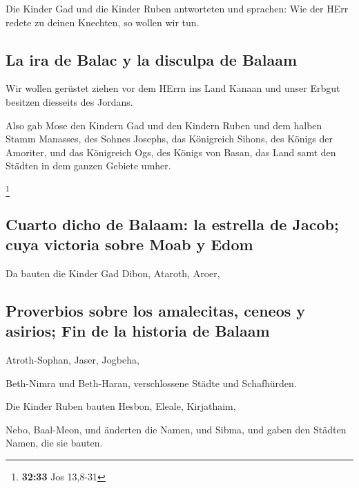  Die Kinder Gad und die Kinder Ruben antworteten und
sprachen: Wie der HErr redete zu deinen Knechten, so wollen wir tun.

\hypertarget{la-ira-de-balac-y-la-disculpa-de-balaam}{%
\subsection{La ira de Balac y la disculpa de
Balaam}\label{la-ira-de-balac-y-la-disculpa-de-balaam}}

 Wir wollen gerüstet ziehen vor dem HErrn ins Land Kanaan
und unser Erbgut besitzen diesseits des Jordans.

 Also gab Mose den Kindern Gad und den Kindern Ruben und
dem halben Stamm Manasses, des Sohnes Josephs, das Königreich Sihons,
des Königs der Amoriter, und das Königreich Ogs, des Königs von Basan,
das Land samt den Städten in dem ganzen Gebiete umher.

\footnote{\textbf{32:33} Jos 13,8-31}

\hypertarget{cuarto-dicho-de-balaam-la-estrella-de-jacob-cuya-victoria-sobre-moab-y-edom}{%
\subsection{Cuarto dicho de Balaam: la estrella de Jacob; cuya victoria
sobre Moab y
Edom}\label{cuarto-dicho-de-balaam-la-estrella-de-jacob-cuya-victoria-sobre-moab-y-edom}}

 Da bauten die Kinder Gad Dibon, Ataroth, Aroer,

\hypertarget{proverbios-sobre-los-amalecitas-ceneos-y-asirios-fin-de-la-historia-de-balaam}{%
\subsection{Proverbios sobre los amalecitas, ceneos y asirios; Fin de la
historia de
Balaam}\label{proverbios-sobre-los-amalecitas-ceneos-y-asirios-fin-de-la-historia-de-balaam}}

 Atroth-Sophan, Jaser, Jogbeha,

 Beth-Nimra und Beth-Haran, verschlossene Städte und
Schafhürden.

 Die Kinder Ruben bauten Hesbon, Eleale, Kirjathaim,

 Nebo, Baal-Meon, und änderten die Namen, und Sibma, und
gaben den Städten Namen, die sie bauten.

